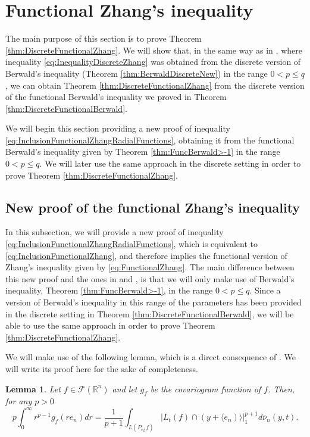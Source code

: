 \documentclass{amsart}
\newcommand{\R}{\mathbb R}
\newtheorem{lemma}{Lemma}[section]
\theoremstyle{remark}
\theoremstyle{definition}
\numberwithin{equation}{section}
\begin{document}

\section{Functional Zhang's inequality}\label{sec:FunctionalZhang}

The main purpose of this section is to prove Theorem \ref{thm:DiscreteFunctionalZhang}. We will show that, in the same way as in \cite{ALM}, where inequality \eqref{eq:InequalityDiscreteZhang} was obtained from the discrete version of Berwald's inequality (Theorem \ref{thm:BerwaldDiscreteNew}) in the range $0<p\leq q$, we can obtain Theorem \ref{thm:DiscreteFunctionalZhang} from the discrete version of the functional Berwald's inequality we proved in Theorem \ref{thm:DiscreteFunctionalBerwald}.

We will begin this section providing a new proof of inequality \eqref{eq:InclusionFunctionalZhangRadialFunctions}, obtaining it from the functional Berwald's inequality given by Theorem \ref{thm:FuncBerwald>-1} in the range $0<p\leq q$. We will later use the same approach in the discrete setting in order to prove Theorem \ref{thm:DiscreteFunctionalZhang}.

\subsection{New proof of the functional Zhang's inequality}\label{subsec:NewProof}

In this subsection, we will provide a new proof of inequality \eqref{eq:InclusionFunctionalZhangRadialFunctions}, which is equivalent to \eqref{eq:InclusionFunctionalZhang}, and therefore implies the functional version of Zhang's inequality given by \eqref{eq:FunctionalZhang}. The main difference between this new proof and the ones in \cite{ABG1} and \cite{ABG2}, is that we will only make use of Berwald's inequality, Theorem \ref{thm:FuncBerwald>-1},  in the range $0 < p \leq q$. Since a version of Berwald's inequality in this range of the parameters has been provided in the discrete setting in Theorem \ref{thm:DiscreteFunctionalBerwald}, we will be able to use the same approach in order to prove
Theorem \ref{thm:DiscreteFunctionalZhang}.

We will make use of the following lemma, which is a direct consequence of \cite[Lem. 3.3]{ABG2}. We will write its proof here for the sake of completeness.

\begin{lemma}\label{lem:LemmaCovariogramRadialFunction}
Let $f \in \mathcal{F}(\R^n)$ and let $g_f$ be the covariogram function of $f$. Then, for any $p>0$
$$
p\int_0^\infty r^{p-1}g_f(re_n)dr=\frac{1}{p+1}\int_{L(P_{e_n^\perp}f)}|L_t(f)\cap(y+\langle e_n)\rangle|_1^{p+1}d\overline{\nu}_{n}(y,t).
$$
\end{lemma}
\end{document}
